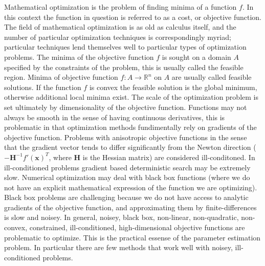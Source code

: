 \documentclass[10pt,a4paper]{article}
\begin{document}
Mathematical optimization is the problem of finding minima of a function $f$. In this context the function in question is referred to as a cost, or objective function. The field of mathematical optimization is as old as calculus itself, and the number of particular optimization techniques is correspondingly myriad; particular techniques lend themselves well to particular types of optimization problems. The minima of the objective function $f$ is sought on a domain $A$ specified by the constraints of the problem, this is usually called the feasible region. Minima of objective function $f: A \rightarrow \mathbb{R}^n$ on $A$ are usually called feasible solutions. If the function $f$ is convex the feasible solution is the global minimum, otherwise additional local minima exist. The scale of the optimization problem is set ultimately by dimensionality of the objective function. Functions may not always be smooth in the sense of having continuous derivatives, this is problematic in that optimization methods fundimentally rely on gradients of the objective function. Problems with anisotropic objective functions in the sense that the gradient vector tends to differ significantly from the Newton direction ($-\mathbf{H}^{-1} f' ( \mathbf{x} )^T$, where $\mathbf{H}$ is the Hessian matrix) are considered ill-conditoned. In ill-conditioned problems gradient based deterministic search may be extremely slow. Numerical optimization may deal with black box functions (where we do not have an explicit mathematical expression of the function we are optimizing). Black box problems are challenging because we do not have access to analytic gradients of the objective function, and approximating them by finite-differences is slow and noisey. In general, noisey, black box, non-linear, non-quadratic, non-convex, constrained, ill-conditioned, high-dimensional objective functions are problematic to optimize. This is the practical essense of the parameter estimation problem. In particular there are few methods that work well with noisey, ill-conditioned problems. 
\end{document}
